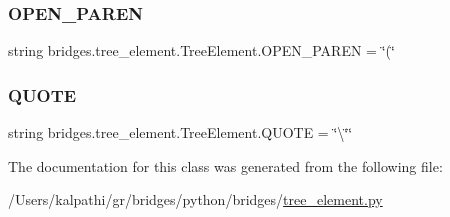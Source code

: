 \subsubsection{\texorpdfstring{OPEN\_PAREN}{OPEN\_PAREN}}
{\footnotesize\ttfamily string bridges.\+tree\+\_\+element.\+Tree\+Element.\+O\+P\+E\+N\+\_\+\+P\+A\+R\+EN = \char`\"{}(\char`\"{}\hspace{0.3cm}{\ttfamily [static]}}

\mbox{\label{classbridges_1_1tree__element_1_1_tree_element_aa5a4d14f38ceb896a85ef0b703d6995a}} 
\subsubsection{\texorpdfstring{QUOTE}{QUOTE}}
{\footnotesize\ttfamily string bridges.\+tree\+\_\+element.\+Tree\+Element.\+Q\+U\+O\+TE = \char`\"{}\textbackslash{}\char`\"{}\char`\"{}\hspace{0.3cm}{\ttfamily [static]}}



The documentation for this class was generated from the following file\+:\begin{DoxyCompactItemize}
\item 
/\+Users/kalpathi/gr/bridges/python/bridges/\mbox{\hyperlink{tree__element_8py}{tree\+\_\+element.\+py}}\end{DoxyCompactItemize}
